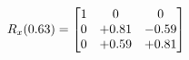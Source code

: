 \documentclass[preview]{standalone}
\begin{document}
\begin{align*}
\special{dvisvgm:raw <g id='unique000'>}R_{x}(0.63) = \begin{bmatrix}1 & 0 & 0 \\0 & +0.81 & -0.59 \\0 & +0.59 & +0.81\end{bmatrix}\special{dvisvgm:raw </g>}
\end{align*}
\end{document}

